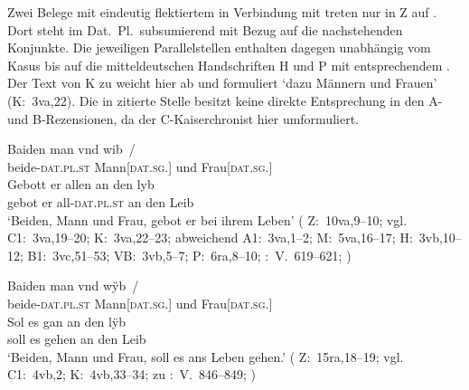 Zwei Belege mit eindeutig flektiertem  in Verbindung mit
 treten nur in Z auf . Dort
steht  im Dat.\ Pl.\ subsumierend mit Bezug auf die nachstehenden
Konjunkte. Die jeweiligen Parallelstellen enthalten dagegen unabhängig vom
Kasus  bis auf die mitteldeutschen Handschriften
H und P mit entsprechendem . Der Text von K zu
 weicht hier ab und formuliert
 `dazu Männern und Frauen'
(K:~3va,22). Die in  zitierte Stelle besitzt keine
direkte Entsprechung in den A- und B-Rezensionen, da der C-Kaiserchronist hier
umformuliert.

\begin{exe}
\ex \label{ex:kczbeidenunde_1}
	\begin{xlist}
	\ex \label{ex:kczbeidenunde1_1}
		\gll Baiden man vnd wib~/ \\
			beide-\textsc{dat.pl\subMF.st} Mann[\textsc{dat.sg.\MascM}] und
				Frau[\textsc{dat.sg.\NeutF}] \\
	\sn \gll Gebott er allen an den lyb \\
			gebot er all-\textsc{dat.pl\subMF.st} an den Leib \\
		\trans `Beiden, Mann und Frau, gebot er bei ihrem Leben'
			(%
				Z:~10va,9--10; vgl.
				C1:~3va,19--20; %
				K:~3va,22--23; abweichend %
				A1:~3va,1--2; %
				M:~5va,16--17; %
				H:~3vb,10--12; %
				B1:~3vc,51--53; %
				VB:~3vb,5--7; %
				P:~6ra,8--10; %
				\KC:~V.~619--621;
				\cite[92]{schroeder1895}%
			)

	\ex \label{ex:kczbeidenunde_2}
		\gll Baiden man vnd wÿb~/ \\
			beide-\textsc{dat.pl\subMF.st} Mann[\textsc{dat.sg.\MascM}] und
				Frau[\textsc{dat.sg.\NeutF}] \\
	\sn \gll Sol es gan an den lÿb \\
			soll es gehen an den Leib \\
		\trans `Beiden, Mann und Frau, soll es ans Leben gehen.'
			(%
				Z:~15ra,18--19; vgl.
				C1:~4vb,2; %
				K:~4vb,33--34; zu %
				\KC:~V.~846--849;
				\cite[97]{schroeder1895}%
			)
	\end{xlist}
\end{exe}

